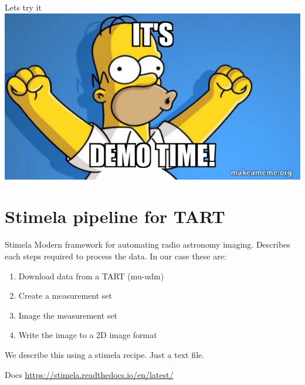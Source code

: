 \documentclass[ignorenonframetext]{beamer}
\begin{document}
\begin{frame}{Lets try it}
\includegraphics[width=\linewidth]{images/demo-time.jpg}
\end{frame}


% 
% 



\section{Stimela pipeline for TART}


\begin{frame}{Stimela}
 Modern framework for automating radio astronomy imaging. Describes each steps required to process the data. In our case these are:
 \begin{enumerate}
  \item Download data from a TART (mu-udm)
  \item Create a measurement set
  \item Image the measurement set
  \item Write the image to a 2D image format
 \end{enumerate}
We describe this using a stimela recipe. Just a text file.
\begin{block}{Docs}
\url{https://stimela.readthedocs.io/en/latest/}
\end{block}
\end{frame}
\end{document}
